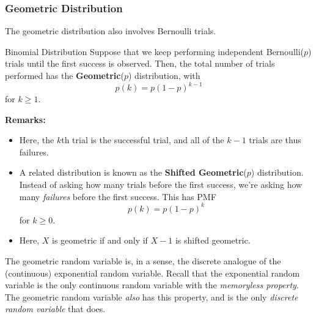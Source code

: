 \subsubsection{Geometric Distribution}
The geometric distribution also involves Bernoulli trials. 
\begin{definition}{Binomial Distribution}{}
    Suppose that we keep performing independent Bernoulli($p$) trials until the first success is observed. Then, the total number of trials performed has the \textbf{Geometric}($p$) distribution, with 
    \[p(k) = p(1 - p)^{k - 1}\]
    for $k \geq 1$. 
\end{definition}
\textbf{Remarks:}
\begin{itemize}
    \item Here, the $k$th trial is the successful trial, and all of the $k - 1$ trials are thus failures. 
    \item A related distribution is known as the \textbf{Shifted Geometric}($p$) distribution. Instead of asking how many trials before the first success, we're asking how many \emph{failures} before the first success. This has PMF 
    \[p(k) = p(1 - p)^k\]
    for $k \geq 0$. 
    \item Here, $X$ is geometric if and only if $X - 1$ is shifted geometric.
\end{itemize}
The geometric random variable is, in a sense, the discrete analogue of the (continuous) exponential random variable. Recall that the exponential random variable is the only continuous random variable with the \emph{memoryless property}. The geometric random variable \emph{also} has this property, and is the only \emph{discrete random variable} that does.
